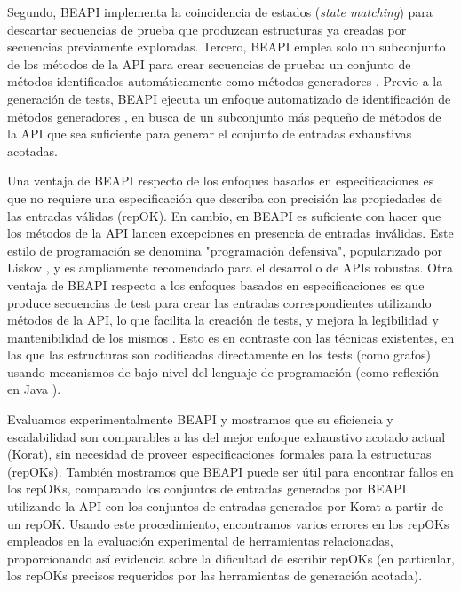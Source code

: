 Segundo, BEAPI implementa la coincidencia de estados (\emph{state matching}) \cite{Iosif02, Politano20, Xie04} para descartar secuencias de prueba que produzcan estructuras ya creadas por secuencias previamente exploradas. Tercero, BEAPI emplea solo un subconjunto de los métodos de la API para crear secuencias de prueba: un conjunto de métodos identificados automáticamente como métodos generadores \cite{Ponzio19}. Previo a la generación de tests, BEAPI ejecuta un enfoque automatizado de identificación de métodos generadores \cite{Ponzio19}, en busca de un subconjunto más pequeño de métodos de la API que sea suficiente para generar el conjunto de entradas exhaustivas acotadas. 

Una ventaja de BEAPI respecto de los enfoques basados en especificaciones es que no requiere una especificación que describa con precisión las propiedades de las entradas válidas (repOK). En cambio, en BEAPI 
es suficiente con
hacer que los métodos de la API lancen excepciones en presencia de entradas inválidas. Este estilo de programación se denomina "programación defensiva", popularizado por Liskov \cite{Liskov00}, y es ampliamente recomendado para el desarrollo de APIs robustas. 
Otra ventaja de BEAPI respecto a los enfoques basados en especificaciones es que produce secuencias de test para crear las entradas correspondientes utilizando métodos de la API, lo que facilita la creación de tests, y mejora la legibilidad y mantenibilidad de los mismos \cite{Braione17}. Esto es en contraste con las técnicas existentes, en las que las estructuras son codificadas directamente en los tests (como grafos) usando mecanismos de bajo nivel del lenguaje de programación (como reflexión en Java \cite{} ).

Evaluamos experimentalmente BEAPI y mostramos que su eficiencia y escalabilidad son comparables a las del mejor enfoque exhaustivo acotado actual (Korat), sin necesidad de proveer especificaciones formales para la estructuras (repOKs). También mostramos que BEAPI puede ser útil para encontrar fallos en los repOKs, comparando los conjuntos de entradas generados por BEAPI utilizando la API con los conjuntos de entradas generados por Korat a partir de un repOK. Usando este procedimiento, encontramos varios errores en los repOKs empleados en la evaluación experimental de herramientas relacionadas, proporcionando así evidencia sobre la dificultad de escribir repOKs (en particular, los repOKs precisos requeridos por las herramientas de generación acotada).


